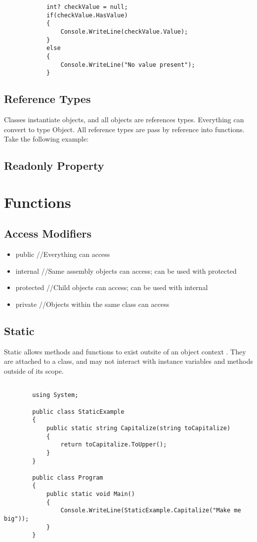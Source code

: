 \documentclass {amsart}
\begin{document}
		\begin{lstlisting}
			int? checkValue = null;
			if(checkValue.HasValue)
			{
				Console.WriteLine(checkValue.Value);
			}
			else
			{
				Console.WriteLine("No value present");
			}
		\end{lstlisting}

	\subsection{Reference Types}  Classes instantiate objects, and all objects are references types.  Everything can convert to type Object.  All reference types are pass by reference into functions.  Take the following example: 

	\subsection{Readonly Property}

\section{Functions}
	\subsection{Access Modifiers}
		\begin{itemize}
			\item public 		//Everything can access
			\item internal 	//Same assembly objects can access; can be used with protected
			\item protected	//Child objects can access; can be used with internal
			\item private		//Objects within the same class can access
		\end{itemize}

	\subsection{Static}  Static allows methods and functions to exist outsite of an object context . They are attached to a class, and may not interact with instance variables and methods outside of its scope.  
		\begin{lstlisting}

		using System;

		public class StaticExample 
		{
			public static string Capitalize(string toCapitalize)
			{
				return toCapitalize.ToUpper();
			}
		}

		public class Program
		{
			public static void Main()
			{
				Console.WriteLine(StaticExample.Capitalize("Make me big"));
			}
		}

		\end{lstlisting}
\end{document}
